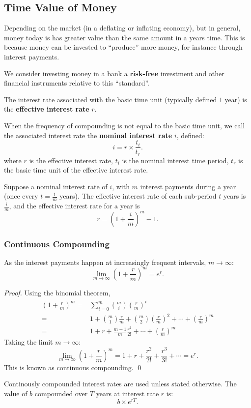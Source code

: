 \subsection{Time Value of Money}
Depending on the market (in a deflating or inflating economy), but in general,
money today is has greater value than the same amount in a years time. This is
because money can be invested to ``produce'' more money, for instance through
interest payments.
\begin{remark}
  We consider investing money in a bank a \textbf{risk-free} investment and
  other financial instruments relative to this ``standard''.
\end{remark}
\begin{definition}
  The interest rate associated with the basic time unit (typically defined $1$
  year) is the \textbf{effective interest rate} $r$.
\end{definition}
\begin{definition}
  When the frequency of compounding is not equal to the basic time unit, we call
  the associated interest rate the \textbf{nominal interest rate} $i$, defined:
  \[i=r\times \frac{t_{i}}{t_{r}}.\] 
  where $r$ is the effective interest rate, $t_{i}$ is the nominal interest
  time period, $t_{r}$ is the basic time unit of the effective interest rate.
\end{definition}
Suppose a nominal interest rate of $i$, with $m$ interest payments during a
year (once every $t=\frac{1}{m}$ years). The effective interest rate of each
sub-period $t$ years is $\frac{i}{m}$, and the effective interest rate for a
year is
\[r={(1+\frac{i}{m})}^{m}-1.\]
\subsubsection{Continuous Compounding}
As the interest payments happen at increasingly frequent intervals, $m\to\infty$:
\[\lim_{m \to \infty} {(1+\frac{r}{m})}^{m}= e^{r}.\]
\begin{proof}
  Using the binomial theorem,
  \begin{align*}
    {\left( 1+\frac{r}{m} \right)} ^{m}=&\sum_{i=0}^{m} \binom{m}{i}{\left( \frac{r}{m} \right)}^{i}\\
    =&1+\binom{m}{1}\frac{r}{m}+\binom{m}{2}{\left( \frac{r}{m} \right) }^{2}+\cdots+{\left( \frac{r}{m} \right)}^{m}\\
    =&1+r+\frac{m-1}{m}\frac{r^{2}}{2\mathpunct{!}}+\cdots+{\left( \frac{r}{m} \right) }^{m}
  \end{align*}
  Taking the limit $m\to\infty$:
  \[\lim_{m \to \infty} {(1+\frac{r}{m})}^{m}=1+r+\frac{r^{2}}{2\mathpunct{!}}+\frac{r^{3}}{3\mathpunct{!}}+\cdots= e^{r}.\]
  This is known as continuous compounding.
  \qed%
\end{proof}
\begin{remark}
  Continously compounded interest rates are used unless stated otherwise. The
  value of $b$ compounded over $T$ years at interest rate $r$ is: \[b\times
  e^{rT}.\]
\end{remark}
